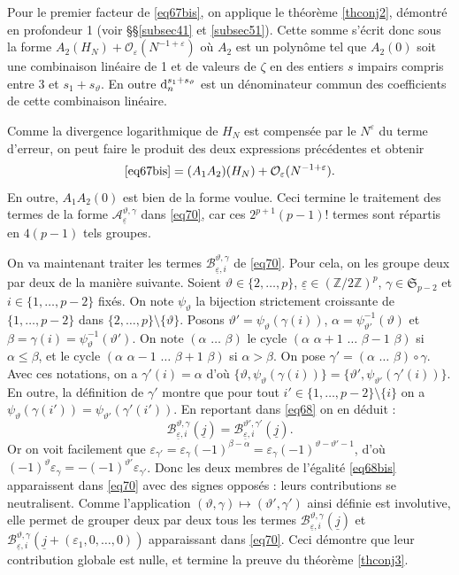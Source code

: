 \documentclass[12pt,francais, reqno]{smfart}
\numberwithin{equation}{section}
\newcommand{\dd}{\textup{d}}
\def\dd{\textup{d}}
\newcommand{\moins}{\setminus}
\newcommand{\Z}{\mathbb Z}
\newcommand{\gdo}{\mathcal{O}}
\newcommand{\sppmd}{{\mathfrak S}_{p-2}}
\newcommand{\zdzp}{(\Z / 2 \Z)^p}
\newcommand{\eps}{\varepsilon}
\newcommand{\gdoeps}{\gdo_\eps (N^{-1+\eps})}
\newcommand{\epssoul}{\underline{\eps}}
\newcommand{\jsoul}{\underline{j}}
\newcommand{\jtisoul}{\underline{j} + (\eps_1, 0, \ldots, 0)}
\newcommand{\unpmd}{\{1,\ldots, p-2\}}
\newcommand{\deuxp}{\{2,\ldots, p\}}
\newcommand{\astgseul}{{\mathcal A}_{\epssoul} ^{\teta, \gamma}  }
\newcommand{\bstgj}{{\mathcal B}_{\epssoul, i} ^{\teta, \gamma} (\jsoul)}
\newcommand{\bstgjti}{{\mathcal B}_{\epssoul, i} ^{\teta, \gamma} (\jtisoul)}
\newcommand{\bstgseul}{{\mathcal B}_{\epssoul, i} ^{\teta, \gamma}  }
\newcommand{\bstgjprime}{{\mathcal B}_{\epssoul, i} ^{\teta', \gamma'} (\jsoul)}
\newcommand{\teta}{\vartheta}
\newcommand{\psiteta}{\psii_{\teta}}
\newcommand{\psitetapr}{\psii_{\teta'}}
\newcommand{\psii}{\psi}
\newcommand{\albe}{(\alpha \, \, \ldots \, \, \beta)}
\newcommand{\albelongun}{(\alpha \, \, \alpha+1 \, \,  \ldots \, \, \beta-1 \, \, \beta)}
\newcommand{\albelongde}{(\alpha \, \, \alpha-1 \, \,  \ldots \, \, \beta+1 \, \, \beta)}
\begin{document}
Pour le premier facteur de \eqref{eq67bis},  on applique le th\'eor\`eme \ref{thconj2}, d\'emontr\'e en profondeur 1 (voir \S \S  \ref{subsec41} et \ref{subsec51}). Cette somme s'\'ecrit  donc sous la forme $A_2(H_N) + \gdoeps$ o\`u $A_2$ est un polyn\^ome tel que $A_2(0)$ soit une combinaison lin\'eaire de 1 et de valeurs de $\zeta$ en des entiers $s$ impairs compris entre 3 et $s_1+s_\teta$. En outre $\dd_n ^{s_1+s_\teta}$ est un d\'enominateur commun des coefficients de cette combinaison lin\'eaire. 

Comme la divergence logarithmique de $H_N$ est compens\'ee par le $N^\eps$ du terme d'erreur, on peut faire le produit des deux expressions pr\'ec\'edentes et obtenir
$$ \eqref{eq67bis}  =   (A_1A_2)(H_N) + \gdoeps . $$
En outre, $A_1A_2(0)$ est bien de la forme voulue. Ceci termine le traitement des termes de la forme  $\astgseul$ dans  \eqref{eq70}, car ces $2^{p+1}(p-1)!$ termes sont r\'epartis en $4(p-1)$ tels groupes. 

\bigskip

On va maintenant traiter les termes $\bstgseul$ de  \eqref{eq70}.
Pour cela, on les groupe deux par deux de la mani\`ere suivante. Soient $\teta \in \deuxp$,  $\epssoul \in \zdzp$, $\gamma \in \sppmd$ et $i \in \unpmd$ fix\'es. On note $\psiteta$ la bijection strictement croissante de $\unpmd$ dans $\deuxp \moins \{\teta\}$. Posons $\teta' = \psiteta(\gamma(i))$, $\alpha = \psitetapr^{-1}(\teta)$ et $\beta = \gamma(i) = \psiteta^{-1}(\teta')$. On note $\albe$ le cycle $\albelongun$ si $\alpha \leq \beta$, et le cycle $\albelongde$ si $\alpha > \beta$. On pose 
$\gamma' = \albe \circ \gamma$. Avec ces notations, on a $\gamma'(i) = \alpha$ d'o\`u $\{\teta, \psiteta(\gamma(i))\} = \{\teta' , \psitetapr(\gamma'(i))\}$. En outre, la d\'efinition de $\gamma'$ montre que pour tout $i' \in \unpmd \moins \{i\}$ on a $\psiteta(\gamma(i')) = \psitetapr(\gamma'(i'))$.  En reportant dans \eqref{eq68} on en d\'eduit : 
\begin{equation} \label{eq68bis}
\bstgj = \bstgjprime.
\end{equation}
Or on voit facilement que $\eps_{\gamma'} = \eps_{\gamma} (-1)^{\beta - \alpha} =  \eps_{\gamma} (-1)^{\teta - \teta'  - 1}$, d'o\`u $(-1)^\teta \eps_\gamma = - (-1)^{\teta'} \eps_{\gamma'}$. Donc les deux membres de l'\'egalit\'e \eqref{eq68bis} apparaissent dans \eqref{eq70} avec des signes oppos\'es : leurs contributions se neutralisent. Comme l'application $(\teta, \gamma) \mapsto (\teta', \gamma')$ ainsi d\'efinie est involutive, elle permet de grouper deux par deux tous les termes $\bstgj$ et $\bstgjti$ apparaissant dans \eqref{eq70}. Ceci d\'emontre que leur contribution globale est nulle, et termine la preuve du th\'eor\`eme \ref{thconj3}. 
\end{document}

